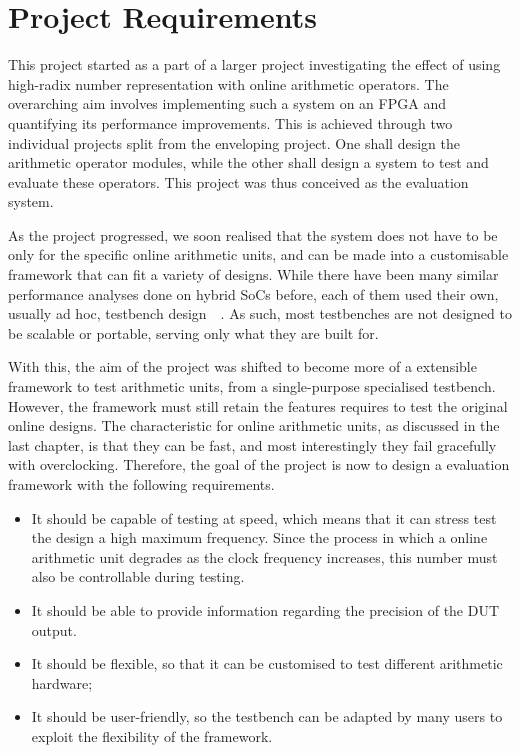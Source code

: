\chapter{Project Requirements}

This project started as a part of a larger project investigating the effect of using high-radix number representation with online arithmetic operators.
The overarching aim involves implementing such a system on an FPGA and quantifying its performance improvements.
This is achieved through two individual projects split from the enveloping project.
One shall design the arithmetic operator modules, while the other shall design a system to test and evaluate these operators.
This project was thus conceived as the evaluation system.

As the project progressed, we soon realised that the system does not have to be only for the specific online arithmetic units, and can be made into a customisable framework that can fit a variety of designs.
While there have been many similar performance analyses done on hybrid SoCs before, each of them used their own, usually ad hoc, testbench design~\cite{Shi1}~\cite{Li1}.
As such, most testbenches are not designed to be scalable or portable, serving only what they are built for.

With this, the aim of the project was shifted to become more of a extensible framework to test arithmetic units, from a single-purpose specialised testbench.
However, the framework must still retain the features requires to test the original online designs.
The characteristic for online arithmetic units, as discussed in the last chapter, is that they can be fast, and most interestingly they fail gracefully with overclocking.
Therefore, the goal of the project is now to design a evaluation framework with the following requirements.

\begin{itemize}
  \setlength\itemsep{0pt}
  \item It should be capable of testing at speed, which means that it can stress test the design a high maximum frequency.
        Since the process in which a online arithmetic unit degrades as the clock frequency increases, this number must also be controllable during testing.
  \item It should be able to provide information regarding the precision of the DUT output.
  \item It should be flexible, so that it can be customised to test different arithmetic hardware;
  \item It should be user-friendly, so the testbench can be adapted by many users to exploit the flexibility of the framework.
\end{itemize}

